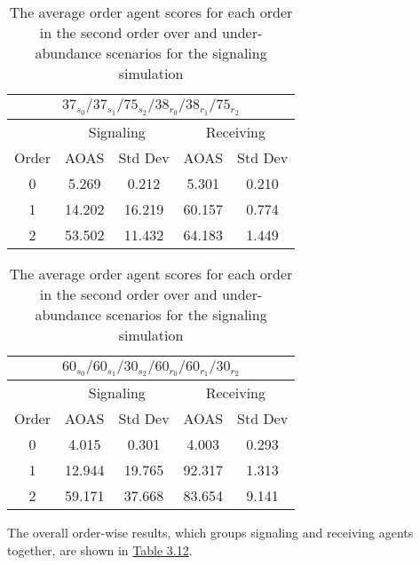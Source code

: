 \begin{table}[h]
    \centering
    \begin{tabular}{|c|c|c|c|c|}
    \hline
    \multicolumn{5}{|c|}{$37_{s_{0}}/37_{s_{1}}/75_{s_{2}}/38_{r_{0}}/38_{r_{1}}/75_{r_{2}}$} \\
    \hline
    \multicolumn{1}{|c|}{} & \multicolumn{2}{|c|}{Signaling} & \multicolumn{2}{|c|}{Receiving} \\
    \hline
    Order & AOAS & Std Dev & AOAS & Std Dev \\
    \hline
    0     & 5.269    & 0.212     & 5.301     & 0.210   \\
    1     & 14.202   & 16.219    & 60.157    & 0.774   \\
    2     & 53.502   & 11.432    & 64.183    & 1.449   \\
    \hline
    \end{tabular}
    \qquad
    \begin{tabular}{|c|c|c|c|c|}
    \hline
    \multicolumn{5}{|c|}{$60_{s_{0}}/60_{s_{1}}/30_{s_{2}}/60_{r_{0}}/60_{r_{1}}/30_{r_{2}}$} \\
    \hline
    \multicolumn{1}{|c|}{} & \multicolumn{2}{|c|}{Signaling} & \multicolumn{2}{|c|}{Receiving} \\
    \hline
    Order & AOAS & Std Dev & AOAS & Std Dev \\
    \hline
    0     & 4.015   & 0.301    & 4.003   & 0.293   \\
    1     & 12.944  & 19.765   & 92.317  & 1.313   \\
    2     & 59.171  & 37.668   & 83.654  & 9.141   \\
    \hline
    \end{tabular}
    \caption{The average order agent scores for each order in the second order over and under-abundance scenarios for the signaling simulation}
    \label{table:sig-second-order-simple}
\end{table}
    
The overall order-wise results, which groups signaling and receiving agents together, are shown in \hyperref[table:sig-second-order-overall]{Table 3.12}.

